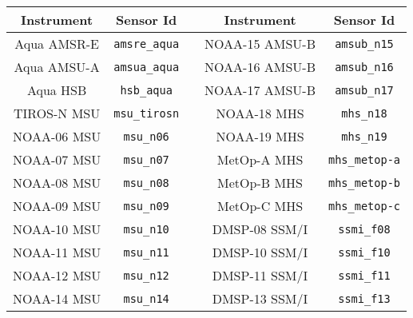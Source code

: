 \begin{table}[htp]
  \centering
  \begin{tabular}{c c c c c}
    \hline
    \sffamily\textbf{Instrument} & \sffamily\textbf{Sensor Id} & \hspace{0.2cm} & \sffamily\textbf{Instrument} & \sffamily\textbf{Sensor Id} \\
    \hline\hline
Aqua AMSR-E     & \texttt{amsre\_aqua}    & \hspace{0.2cm} & NOAA-15 AMSU-B   & \texttt{amsub\_n15}         \\
Aqua AMSU-A     & \texttt{amsua\_aqua}    & \hspace{0.2cm} & NOAA-16 AMSU-B   & \texttt{amsub\_n16}         \\
Aqua HSB        & \texttt{hsb\_aqua}      & \hspace{0.2cm} & NOAA-17 AMSU-B   & \texttt{amsub\_n17}         \\
TIROS-N MSU     & \texttt{msu\_tirosn}    & \hspace{0.2cm} & NOAA-18 MHS      & \texttt{mhs\_n18}           \\
NOAA-06 MSU     & \texttt{msu\_n06}       & \hspace{0.2cm} & NOAA-19 MHS      & \texttt{mhs\_n19}           \\
NOAA-07 MSU     & \texttt{msu\_n07}       & \hspace{0.2cm} & MetOp-A MHS      & \texttt{mhs\_metop-a}       \\
NOAA-08 MSU     & \texttt{msu\_n08}       & \hspace{0.2cm} & MetOp-B MHS      & \texttt{mhs\_metop-b}       \\
NOAA-09 MSU     & \texttt{msu\_n09}       & \hspace{0.2cm} & MetOp-C MHS      & \texttt{mhs\_metop-c}       \\
NOAA-10 MSU     & \texttt{msu\_n10}       & \hspace{0.2cm} & DMSP-08 SSM/I    & \texttt{ssmi\_f08}          \\
NOAA-11 MSU     & \texttt{msu\_n11}       & \hspace{0.2cm} & DMSP-10 SSM/I    & \texttt{ssmi\_f10}          \\
NOAA-12 MSU     & \texttt{msu\_n12}       & \hspace{0.2cm} & DMSP-11 SSM/I    & \texttt{ssmi\_f11}          \\
NOAA-14 MSU     & \texttt{msu\_n14}       & \hspace{0.2cm} & DMSP-13 SSM/I    & \texttt{ssmi\_f13}          \\

\end{tabular}
\end{table}
